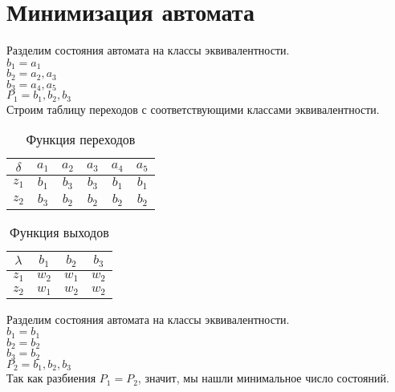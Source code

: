 \documentclass[a4paper,10pt]{article}
\begin{document}
\section*{Минимизация автомата}
	Разделим состояния автомата на классы эквивалентности. \\
	$b_1 = { a_1 }$ \\ 
	$b_2 = { a_2, a_3 }$ \\
	$b_3 = { a_4, a_5 }$ \\
	$P_1 = { b_1, b_2, b_3 }$ \\
	Строим таблицу переходов с соответствующими классами эквивалентности. \\
	\begin{table}[h!]
		\center
		\begin{tabular}{|c|c|c|c|c|c|}
			\hline
			$\delta$ & $a_1$ & $a_2$ & $a_3$ & $a_4$ & $a_5$ \\ \hline 
			 $z_1$	 & $b_1$ & $b_3$ & $b_3$ & $b_1$ & $b_1$ \\ \hline 
			 $z_2$   & $b_3$ & $b_2$ & $b_2$ & $b_2$ & $b_2$ \\ \hline
		\end{tabular}
		\caption{Функция переходов}
    \end{table}
	\begin{table}[h!]
		\center
		\begin{tabular}{|c|c|c|c|}
			\hline
			$\lambda$ & $b_1$ & $b_2$ & $b_3$ \\ \hline 
			 $z_1$	  & $w_2$ & $w_1$ & $w_2$ \\ \hline 
			 $z_2$    & $w_1$ & $w_2$ & $w_2$ \\ \hline
		\end{tabular}
		\caption{Функция выходов}
    \end{table}
	Разделим состояния автомата на классы эквивалентности. \\
	$b_1 = { b_1 }$ \\ 
	$b_2 = { b_2 }$ \\
	$b_3 = { b_2 }$ \\
	$P_2 = { b_1, b_2, b_3 }$ \\
	Так как разбиения $P_1 = P_2$, значит, мы нашли минимальное число состояний. \\
		 
\end{document}
